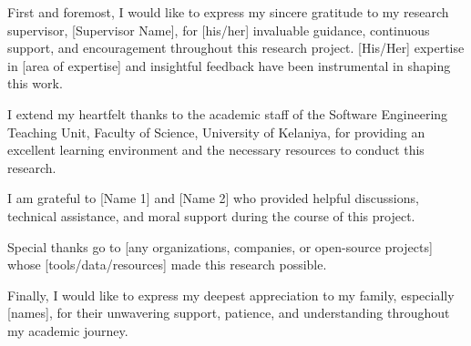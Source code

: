 
\begin{acknowledgement}


First and foremost, I would like to express my sincere gratitude to my research supervisor, [Supervisor Name], for [his/her] invaluable guidance, continuous support, and encouragement throughout this research project. [His/Her] expertise in [area of expertise] and insightful feedback have been instrumental in shaping this work.

I extend my heartfelt thanks to the academic staff of the Software Engineering Teaching Unit, Faculty of Science, University of Kelaniya, for providing an excellent learning environment and the necessary resources to conduct this research.

I am grateful to [Name 1] and [Name 2] who provided helpful discussions, technical assistance, and moral support during the course of this project.

Special thanks go to [any organizations, companies, or open-source projects] whose [tools/data/resources] made this research possible.

Finally, I would like to express my deepest appreciation to my family, especially [names], for their unwavering support, patience, and understanding throughout my academic journey.

\end{acknowledgement}
